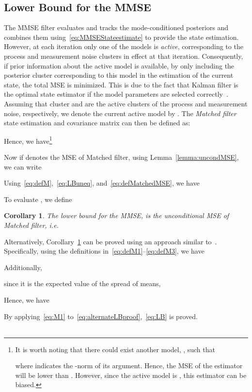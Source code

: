 \documentclass[10pt,twocolumn,twoside]{IEEEtran}
\newtheorem{corol}{Corollary}
\begin{document}
\subsection{Lower Bound for the MMSE}
\label{sec:LB}
The MMSE filter evaluates and tracks the mode-conditioned posteriors and combines them using~\eqref{eq:MMSEStateestimate} to provide the state estimation. However, at each iteration only one of the models is \textit{active}, corresponding to the process and measurement noise clusters in effect at that iteration. Consequently, if prior information about the active model is available, by only including the posterior cluster corresponding to this model in the estimation of the current state, the total MSE is minimized. This is due to the fact that Kalman filter is the optimal state estimator if the model parameters are selected correctly~\cite{arulampalam_tutorial_2002,ho_bayesian_1964}. Assuming that cluster  and  are the active clusters of the process and measurement noise, respectively, we denote the current active model by . The \textit{Matched filter} state estimation and covariance matrix can then be defined as:

Hence, we have\footnote{It is worth noting that there could exist another model, , such that

where  indicates the -norm of its argument.
Hence, the MSE of the estimator  will be lower than . However, since the active model is , this estimator can be biased. }

Now if  denotes the MSE of Matched filter, using Lemma~\ref{lemma:uncondMSE}, we can write

Using~\eqref{eq:defM},~\eqref{eq:LBuneq}, and~\eqref{eq:defMatchedMSE}, we have

To evaluate , we define

\begin{corol}
\label{corolLB}
The lower bound for the MMSE, is the unconditional MSE of Matched filter, i.e.

\end{corol}
Alternatively, Corollary~\ref{corolLB} can be proved using an approach similar to~\cite{flam_mmse_2012}. Specifically, using the definitions in~\eqref{eq:defM1}--\eqref{eq:defM3}, we have

Additionally, 

since it is the expected value of the spread of means,

Hence, we have

By applying~\eqref{eq:M1} to~\eqref{eq:alternateLBproof},~\eqref{eq:LB} is proved. \ \ \ \ \ \ \ \ \ \ \ \ \ \ \ \ \ \ \ \ \ \ \ \
\IEEEQED
\end{document}
